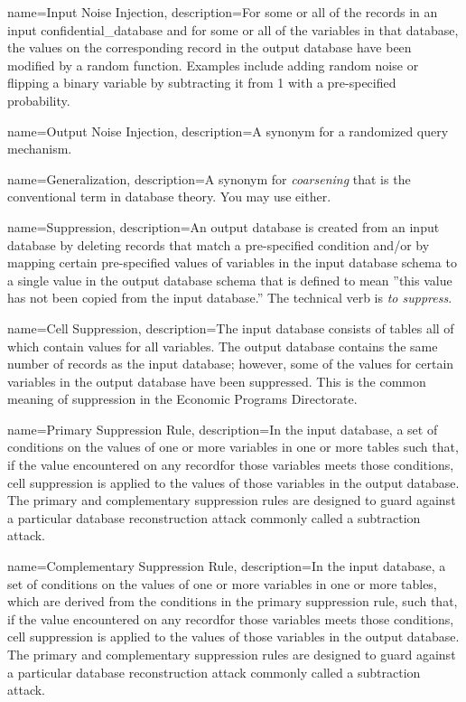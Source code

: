 {
    name=Input Noise Injection,
    description={For some or all of the \glspl{record} in an input \gls{confidential_database} and for some or all of the variables in that database, the values on the corresponding record in the output database have been modified by a random function. Examples include adding random noise or flipping a binary variable by subtracting it from 1 with a pre-specified probability.}
}

{
    name=Output Noise Injection,
    description={A synonym for a randomized query mechanism.}
}

{
    name=Generalization,
    description={A synonym for \emph{coarsening} that is the conventional term in database theory. You may use either.}
}

{
    name=Suppression,
    description={An output database is created from an input database by deleting \glspl{record} that match a pre-specified condition and/or by mapping certain pre-specified values of variables in the input database schema to a single value in the output database schema that is defined to mean ''this value has not been copied from the input database.'' The technical verb is \textit{to suppress}.}
}

{
    name=Cell Suppression,
    description={The input database consists of tables all of which contain values for all variables. The output database contains the same number of \glspl{record} as the input database; however, some of the values for certain variables in the output database have been suppressed. This is the common meaning of suppression in the Economic Programs Directorate.}
}

{
    name=Primary Suppression Rule,
    description={In the input database, a set of conditions on the values of one or more variables in one or more tables such that, if the value encountered on any \gls{record}for those variables meets those conditions, cell suppression is applied to the values of those variables in the output database. The primary and complementary suppression rules are designed to guard against a particular database reconstruction attack commonly called a subtraction attack.}
}

{
    name=Complementary Suppression Rule,
    description={In the input database, a set of conditions on the values of one or more variables in one or more tables, which are derived from the conditions in the primary suppression rule, such that, if the value encountered on any \gls{record}for those variables meets those conditions, cell suppression is applied to the values of those variables in the output database. The primary and complementary suppression rules are designed to guard against a particular database reconstruction attack commonly called a subtraction attack.}
}

